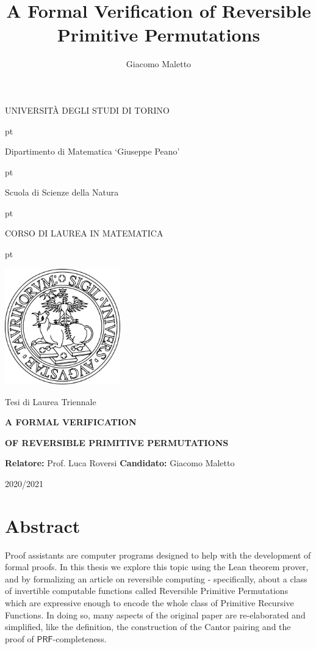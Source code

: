 \documentclass[oneside]{book}
\title{A Formal Verification of Reversible Primitive Permutations}
\author{Giacomo Maletto}
\date{}
\theoremstyle{definition}
\theoremstyle{remark}
\theoremstyle{plain}
\newcommand{\PRF}{\mathsf{PRF}}
\begin{document}

\frontmatter

\thispagestyle{empty}

\centerline {\Large{\textsc{ UNIVERSIT\`A DEGLI STUDI DI TORINO}}}
 pt

\centerline {\Large{\textsc Dipartimento di Matematica `Giuseppe Peano'}}

 pt

\centerline {{\textsc Scuola di Scienze della Natura}}

 pt

\centerline {\Large{\textsc CORSO DI LAUREA IN MATEMATICA}}

 pt


\centerline {\includegraphics[width=5cm]{Immagini/logo.png}}


\vskip 1.2cm

\centerline {\normalsize {Tesi di Laurea Triennale}} 

\vskip 0.7cm

\centerline {\Large {\bf A FORMAL VERIFICATION}}

\vskip 0.3cm

\centerline {\Large {\bf OF REVERSIBLE PRIMITIVE PERMUTATIONS}}

\vskip 1.4cm

\noindent \textbf{Relatore:} Prof. Luca Roversi
\hfill  {\textbf{Candidato:} Giacomo Maletto }

\vskip 2.5cm

\centerline{2020/2021}

\section*{Abstract}

Proof assistants are computer programs designed to help with
the development of formal proofs.
In this thesis we explore this topic using the Lean theorem prover,
and by formalizing an article \cite{PAOLINI2020218} on reversible computing -
specifically, about a class of invertible computable functions called Reversible Primitive Permutations
which are expressive enough to encode the whole class of Primitive Recursive Functions.
In doing so, many aspects of the original paper are re-elaborated and simplified,
like the definition, the construction of the Cantor pairing and the proof of $\PRF$-completeness.
\end{document}

